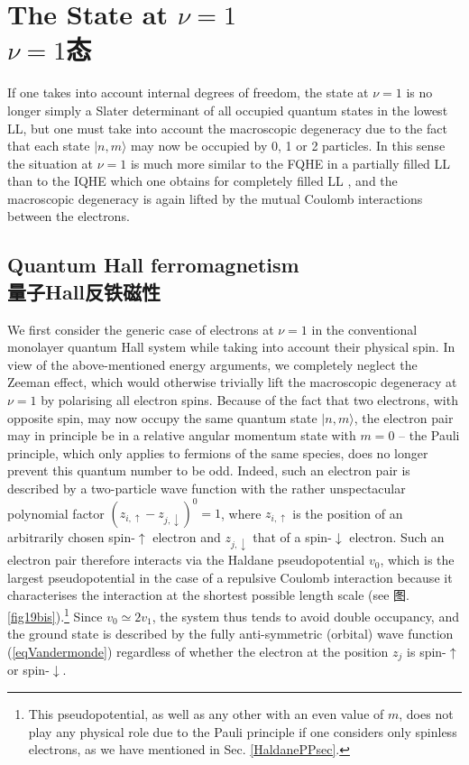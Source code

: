 \documentclass[10pt]{book}
\newcommand{\ua}{\uparrow}
\newcommand{\da}{\downarrow}
\begin{document}
\section[$\nu=1$态]{The State at $\nu=1$\\\bf $\nu=1$态}
\label{Nu1}




If one takes into account internal degrees of freedom, the state at $\nu=1$ is no longer simply a Slater determinant of all occupied
quantum states in the lowest LL, but one must take into account the macroscopic degeneracy due to the fact that each state $|n,m\rangle$
may now be occupied by 0, 1 or 2 particles. In this sense the situation at $\nu=1$ is much more similar to the FQHE in a partially
filled LL than to the IQHE which one obtains for completely filled LL \cite{sondhi}, and the macroscopic degeneracy is again
lifted by the mutual Coulomb interactions between the electrons.


\subsection[量子Hall反铁磁性]{Quantum Hall ferromagnetism\\\bf 量子Hall反铁磁性}
\label{SpinFM}


We first consider the generic case of electrons at $\nu=1$ in the conventional monolayer quantum Hall system while taking
into account their physical spin. In view of the above-mentioned energy arguments, we completely neglect the Zeeman effect, which
would otherwise trivially lift the macroscopic degeneracy at $\nu=1$ by polarising all electron spins. Because of the fact that
two electrons, with opposite spin, may now occupy the same quantum state $|n,m\rangle$, the electron pair may in principle be in
a relative angular momentum state with $m=0$ -- the Pauli principle, which only applies to fermions of the same species, does
no longer prevent this quantum number to be odd. Indeed, such an electron pair is described by a two-particle wave function with the
rather unspectacular polynomial factor $(z_{i,\ua}-z_{j,\da})^0=1$, where $z_{i,\ua}$ is the position of an arbitrarily chosen 
spin-$\ua$ electron and $z_{j,\da}$ that of a spin-$\da$ electron. Such an electron pair therefore interacts via the Haldane
pseudopotential $v_0$, which is the largest pseudopotential in the case of a repulsive Coulomb interaction because it
characterises the interaction at the shortest possible length scale
(see 图. \ref{fig19bis}).\footnote{This pseudopotential, as well as any other
with an even value of $m$, does not play any physical role due to the Pauli principle 
if one considers only spinless electrons, as we have mentioned in Sec. \ref{HaldanePPsec}.}
Since $v_0\simeq 2v_1$, the system thus tends to avoid double occupancy, and the ground state is described by the fully anti-symmetric
(orbital) wave function (\ref{eqVandermonde}) regardless of whether the electron at the position $z_j$ is spin-$\ua$ or spin-$\da$.
\end{document}
